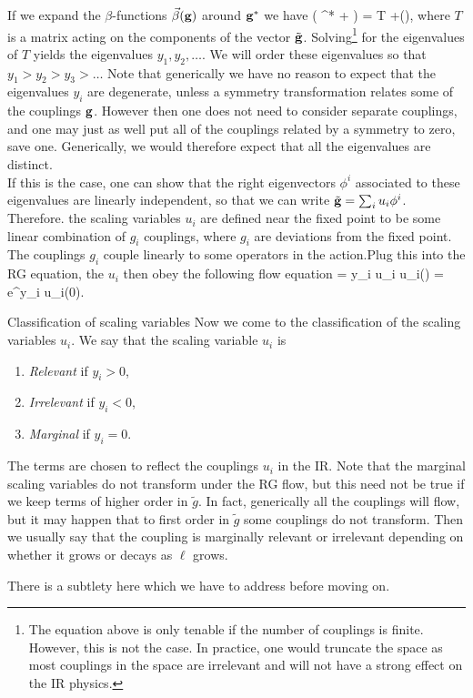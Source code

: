 If we expand the $\beta$-functions $\vec{\beta}(\mathbf{g})$ around $\mathbf{g}^*$ we have
\be 
\mathbf{\beta}( \mathg^* + \tilde{\mathg}) = T \tilde{\mathg} +\mO(),
\ee 
where $T$ is a matrix acting on the components of the vector $\tilde{\mathbf{g}}$. Solving\footnote{The equation above is only tenable if the number of couplings is finite. However, this is not the case. In practice, one would truncate the space as most couplings in the space are irrelevant and will not have a strong effect on the IR physics.} for the eigenvalues of $T$ yields the eigenvalues $y_1,y_2,\dots$. We will order these eigenvalues so that $y_1>y_2>y_3>\dots$ Note that generically we have no reason to expect that the eigenvalues $y_i$ are degenerate, unless a symmetry transformation relates some of the couplings $\mathbf{g}$. However then one does not need to consider separate couplings, and one may just as well put all of the couplings related by a symmetry to zero, save one. Generically, we would therefore expect that all the eigenvalues are distinct.\\
If this is the case, one can show that the right eigenvectors $\phi^i$ associated to these eigenvalues are linearly independent, so that we can write $\tilde{\mathbf{g}}= \sum_i u_i \phi^i$. Therefore. the scaling variables $u_i$ are defined near the fixed point to be some linear combination of $g_i$ couplings, where $g_i$ are deviations from the fixed point. The couplings $g_i$ couple linearly to some operators in the action.Plug this into the RG equation, the $u_i$ then obey the following flow equation
\be 
{} = y_i u_i \; \Rightarrow \; u_i(\ell) = e^{y_i \ell} u_i(0).
\ee 
\begin{mybox}{Classification of scaling variables}
Now we come to the classification of the scaling variables $u_i$. We say that the scaling variable $u_i$ is
\begin{enumerate}
	\item \emph{Relevant} if $y_i >0$,
	\item \emph{Irrelevant} if $y_i <0$,
	\item \emph{Marginal} if $y_i=0$.
\end{enumerate}
The terms are chosen to reflect the couplings $u_i$ in the IR. Note that the marginal scaling variables do not transform under the RG flow, but this need not be true if we keep terms of higher order in $\tilde{g}$. In fact, generically all the couplings will flow, but it may happen that to first order in $\tilde{g}$ some couplings do not transform. Then we usually say that the coupling is marginally relevant or irrelevant depending on whether it grows or decays as $\ell$ grows.
\end{mybox}
There is a subtlety here which we have to address before moving on.
